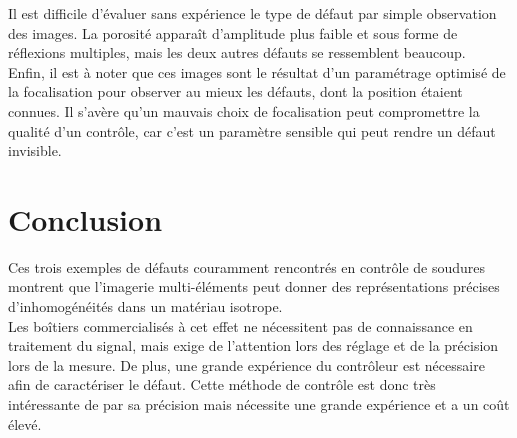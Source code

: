 \documentclass[twoside]{article}
\begin{document}
\begin{multicols}{2}
Il est difficile d'évaluer sans expérience le type de défaut par simple observation des images. La porosité apparaît d'amplitude plus faible et sous forme de réflexions multiples, mais les deux autres défauts se ressemblent beaucoup.\\

Enfin, il est à noter que ces images sont le résultat d'un paramétrage optimisé de la focalisation pour observer au mieux les défauts, dont la position étaient connues. Il s'avère qu'un mauvais choix de focalisation peut compromettre la qualité d'un contrôle, car c'est un paramètre sensible qui peut rendre un défaut invisible.

\section{Conclusion}

Ces trois exemples de défauts couramment rencontrés en contrôle de soudures montrent que l'imagerie multi-éléments peut donner des représentations précises d'inhomogénéités dans un matériau isotrope. \\
Les boîtiers commercialisés à cet effet ne nécessitent pas de connaissance en traitement du signal, mais exige de l'attention lors des réglage et de la précision lors de la mesure. De plus, une grande expérience du contrôleur est nécessaire afin de caractériser le défaut. Cette méthode de contrôle est donc très intéressante de par sa précision mais nécessite une grande expérience et a un coût élevé. 



%
% 


\end{multicols}
\end{document}
